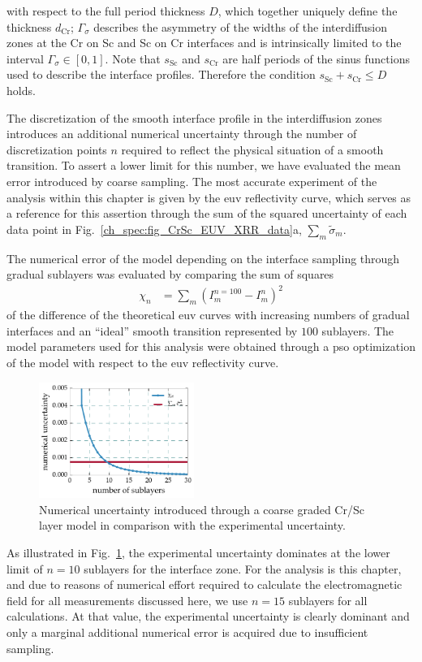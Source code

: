 with respect to the full period thickness $D$, which together uniquely define the thickness $d_\text{Cr}$; $\Gamma_\sigma$ describes the 
asymmetry of the widths of the interdiffusion zones at the Cr on Sc and Sc on Cr 
interfaces and is intrinsically limited to the interval $\Gamma_\sigma \in [0,1]$. Note that 
$s_\text{Sc}$ and $s_\text{Cr}$ are half periods of the sinus functions used to 
describe the interface profiles. Therefore the condition $s_\text{Sc} + 
s_\text{Cr} \leq D$ holds.

The discretization of the smooth interface profile in the interdiffusion zones introduces an additional numerical uncertainty through the number of discretization points $n$ required to reflect the physical situation of a smooth transition. To assert a lower limit for this number, we have evaluated the mean error introduced by coarse sampling. The most accurate experiment of the analysis within this chapter is given by the \gls{euv} reflectivity curve, which serves as a reference for this assertion through the sum of the squared uncertainty of each data point in Fig.~\ref{ch_spec:fig_CrSc_EUV_XRR_data}a, $\sum_m \tilde{\sigma}_m$. 

The numerical error of the model depending on the interface sampling through gradual sublayers was evaluated by comparing the sum of squares
\begin{align}
\chi_n &= \sum\limits_m (I^{n=100}_m - I^n_m)^2
\end{align}
of the difference of the theoretical \gls{euv} curves with increasing numbers of gradual interfaces and an ``ideal'' smooth transition represented by $100$ sublayers. The model parameters used for this analysis were obtained through a \gls{pso} optimization of the model with respect to the \gls{euv} reflectivity curve.
\begin{figure}[htbp]
  \centering
  \includegraphics[width=0.45\textwidth]{img/CrSc_numerical_uncertainty_mixlayer}
  \caption{Numerical uncertainty introduced through a coarse graded Cr/Sc layer model in comparison with the experimental uncertainty.}
  \label{ch_spec:fig_CrSc_numerical_uncertainty_mixlayer}
\end{figure}
As illustrated in Fig.~\ref{ch_spec:fig_CrSc_numerical_uncertainty_mixlayer}, the experimental uncertainty dominates at the lower limit of $n=10$ sublayers for the interface zone.
For the analysis is this chapter, and due to reasons of numerical effort required to calculate the electromagnetic field for all measurements discussed here, we use $n=15$ sublayers for all calculations. At that value, the experimental uncertainty is clearly dominant and only a marginal additional numerical error is acquired due to insufficient sampling.

